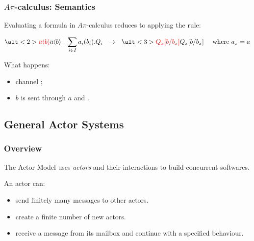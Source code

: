 \documentclass{beamer}
\theoremstyle{remark}
\theoremstyle{definition}
\begin{document}
\begin{frame}
\frametitle{$A\pi$-calculus: Semantics}
Evaluating a formula in $A\pi$-calculus reduces to applying the rule:


\begin{equation*}
\alt<2>{\textcolor{red}{\overline{a}\langle b \rangle}}{\overline{a}\langle b \rangle} \;|\; \sum_{i \in I} a_i(b_i).Q_i
~~ \rightarrow ~~
\alt<3>{\textcolor{red}{Q_x[b/b_x]}}{Q_x[b/b_x]}
~~~~ \text{where $a_x = a$}
\end{equation*}

\vspace{10pt}

What happens:
\begin{itemize}
\item channel ;
\item $b$ is sent through $a$ and .
\end{itemize}
\end{frame}

\subsection{General Actor Systems}

\begin{frame}
\frametitle{Overview}
The Actor Model\cite{DBLP:conf/ijcai/HewittBS73,WilliamClinger81,GulAgha86} uses \emph{actors} and their interactions to build concurrent softwares.\\

\vspace{5pt}

An actor can:
\begin{itemize}
\item send finitely many messages to other actors.
\item create a finite number of new actors.
\item receive a message from its mailbox and continue with a specified behaviour.
\end{itemize}

\vspace{10pt}

\end{frame}
\end{document}
